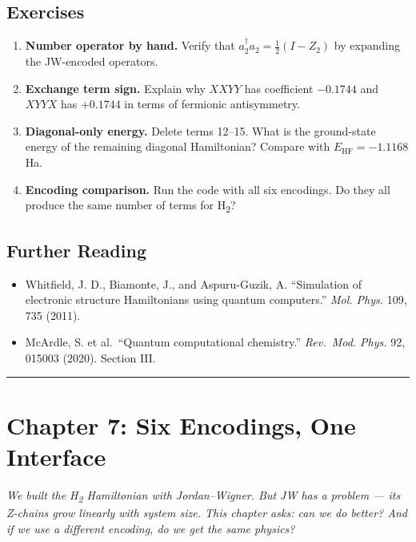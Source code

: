 \documentclass[
  11pt,
  oneside]{book}
\providecommand{\tightlist}{%
  \setlength{\itemsep}{0pt}\setlength{\parskip}{0pt}}
\begin{document}
\section{Exercises}\label{exercises-5}

\begin{enumerate}
\def\labelenumi{\arabic{enumi}.}
\item
  \textbf{Number operator by hand.} Verify that
  \(a_2^\dagger a_2 = \frac{1}{2}(I - Z_2)\) by expanding the JW-encoded
  operators.
\item
  \textbf{Exchange term sign.} Explain why \(XXYY\) has coefficient
  \(-0.1744\) and \(XYYX\) has \(+0.1744\) in terms of fermionic
  antisymmetry.
\item
  \textbf{Diagonal-only energy.} Delete terms 12--15. What is the
  ground-state energy of the remaining diagonal Hamiltonian? Compare
  with \(E_{\text{HF}} = -1.1168\) Ha.
\item
  \textbf{Encoding comparison.} Run the code with all six encodings. Do
  they all produce the same number of terms for H\textsubscript{2}?
\end{enumerate}

\section{Further Reading}\label{further-reading-5}

\begin{itemize}
\tightlist
\item
  Whitfield, J. D., Biamonte, J., and Aspuru-Guzik, A. ``Simulation of
  electronic structure Hamiltonians using quantum computers.''
  \emph{Mol. Phys.} 109, 735 (2011).
\item
  McArdle, S. et al.~``Quantum computational chemistry.''
  \emph{Rev.~Mod. Phys.} 92, 015003 (2020). Section III.
\end{itemize}

\begin{center}\rule{0.5\linewidth}{0.5pt}\end{center}

\chapter{Chapter 7: Six Encodings, One
Interface}\label{chapter-7-six-encodings-one-interface}

\emph{We built the H\textsubscript{2} Hamiltonian with Jordan--Wigner. But JW has a
problem --- its Z-chains grow linearly with system size. This chapter
asks: can we do better? And if we use a different encoding, do we get
the same physics?}
\end{document}
